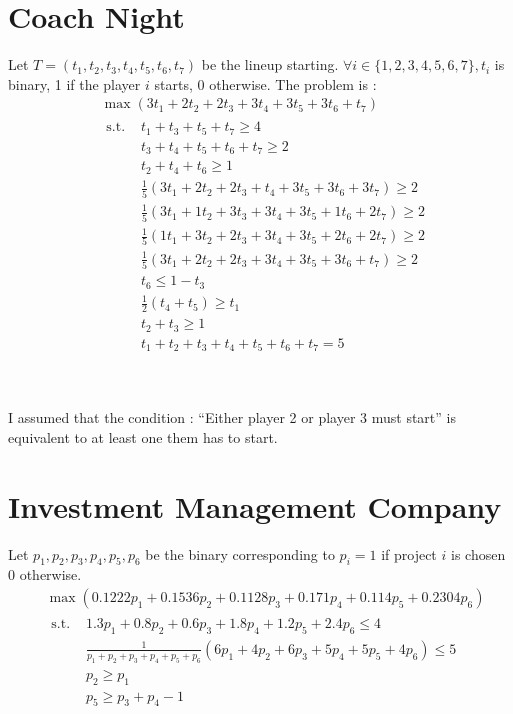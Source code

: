 \documentclass{article}
\begin{document}
\section*{Coach Night}
Let $T = (t_1,t_2,t_3,t_4,t_5,t_6,t_7)$ be the lineup starting. $\forall i \in \{1,2,3,4,5,6,7\}, t_i$ is binary, 1 if the player $i$ starts, 0 otherwise.
The problem is : 
\begin{equation}
    \boxed{
    \begin{split}
    &\max(3t_1+2t_2+2t_3+3t_4+3t_5+3t_6+t_7) \\
    & \begin{split}
        \text{s.t. } & t_1+t_3+t_5+t_7 \ge 4\\
        &t_3+t_4+t_5+t_6+t_7 \ge2\\
        &t_2+t_4+t_6 \ge 1\\
        &\frac{1}{5}(3t_1+2t_2+2t_3+t_4+3t_5+3t_6+3t_7)\ge 2\\
        &\frac{1}{5}(3t_1+1t_2+3t_3+3t_4+3t_5+1t_6+2t_7)\ge 2\\
        &\frac{1}{5}(1t_1+3t_2+2t_3+3t_4+3t_5+2t_6+2t_7)\ge 2\\
        &\frac{1}{5}(3t_1+2t_2+2t_3+3t_4+3t_5+3t_6+t_7)\ge 2\\
        &t_6\leq1-t_3\\
        &\frac{1}{2}(t_4+t_5)\ge t_1\\
        &t_2+t_3 \ge 1\\
        &t_1+t_2+t_3+t_4+t_5+t_6+t_7=5\\
    \end{split}\\
    \end{split}}
\end{equation}\\\\
I assumed that the condition : ``Either player 2 or player 3 must start'' is equivalent to at least one them has to start.
\section*{Investment Management Company}
Let $p_1,p_2,p_3,p_4,p_5,p_6$ be the binary corresponding to $p_i = 1$ if project $i$ is chosen 0 otherwise. 
\begin{equation}
    \boxed{
    \begin{split}
    &\max(0.1222p_1+0.1536p_2+0.1128p_3+0.171p_4+0.114p_5+0.2304p_6)  \\
    &\begin{split}
    \text{s.t. } & 1.3p_1+0.8p_2+0.6p_3+1.8p_4+1.2p_5+2.4p_6\leq 4\\
    & \frac{1}{p_1+p_2+p_3+p_4+p_5+p_6}(6p_1+4p_2+6p_3+5p_4+5p_5+4p_6) \leq 5\\
    & p_2\ge p_1\\
    & p_5\ge p_3+p_4-1\\
    \end{split}\\
    \end{split}}
\end{equation}\\\\
\end{document}
